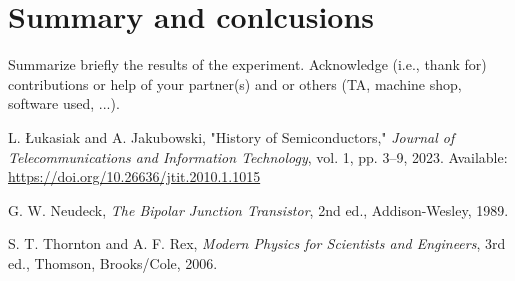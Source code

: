 \documentclass[12pt,letterpaper,onecolumn]{article}
\begin{document}

\section{Summary and conlcusions}

Summarize briefly the results of the experiment.
Acknowledge (i.e., thank for) contributions or help
of your partner(s) and or
others (TA, machine shop, software used, ...).


\begin{thebibliography}{9}

L. Łukasiak and A. Jakubowski, 
"History of Semiconductors," 
\textit{Journal of Telecommunications and Information Technology}, vol. 1, pp. 3–9, 2023. 
Available: \url{https://doi.org/10.26636/jtit.2010.1.1015}

G. W. Neudeck, 
\textit{The Bipolar Junction Transistor}, 2nd ed., 
Addison-Wesley, 1989.

S. T. Thornton and A. F. Rex, 
\textit{Modern Physics for Scientists and Engineers}, 3rd ed., 
Thomson, Brooks/Cole, 2006.

\end{thebibliography}

\end{document}
